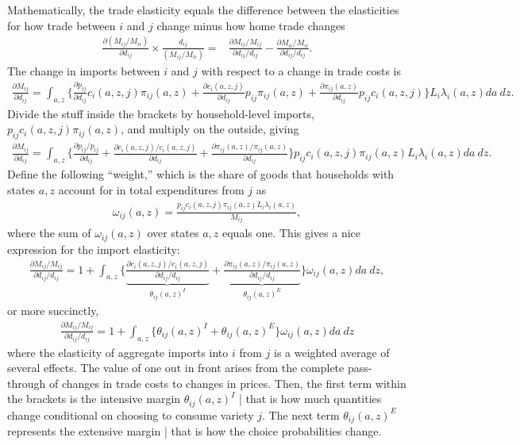 \documentclass[12pt,pdftex]{article}
\begin{document}
\begin{onehalfspacing}
Mathematically, the trade elasticity equals the difference between the elasticities for how trade between $i$ and $j$ change minus how home trade changes
\begin{align}
\frac{\partial ( M_{ij} / M_{ii} )}{\partial d_{ij}} \times \frac{d_{ij}}{( M_{ij} / M_{ii} )} =& \frac{\partial M_{ij} / M_{ij}}{\partial d_{ij} / d_{ij}}  - \frac{\partial M_{ii} / M_{ii}}{\partial d_{ij} / d_{ij}}.
\label{apx-eq:def_trade_elasticity}
\end{align}
The change in imports between $i$ and $j$ with respect to a change in trade costs is
\begin{align}
\frac{\partial  M_{ij}}{\partial d_{ij}} = \int_{a,z} \bigg \{\frac{\partial p_{ij}}{\partial d_{ij}} c_{i}(a,z,j) \pi_{ij}(a,z) +  \frac{\partial c_{i}(a,z,j)}{\partial d_{ij}} p_{ij} \pi_{ij}(a,z) +
 \frac{\partial \pi_{ij}(a,z)}{\partial d_{ij}} p_{ij}c_{i}(a,z,j) \bigg \} L_i \lambda_{i}(a,z) da \ dz.
\end{align}
Divide the stuff inside the brackets by household-level imports, $p_{ij}c_{i}(a,z,j)\pi_{ij}(a,z)$, and multiply on the outside, giving
\begin{align}
\frac{\partial  M_{ij}}{\partial d_{ij}} = \int_{a,z}  \bigg \{ \frac{\partial p_{ij}/p_{ij}}{\partial d_{ij}}  + \frac{\partial c_{i}(a,z,j)/ c_{i}(a,z,j)}{\partial d_{ij}} +
 \frac{\partial \pi_{ij}(a,z) / \pi_{ij}(a,z)}{\partial d_{ij}}  \bigg \} p_{ij}c_{i}(a,z,j)\pi_{ij}(a,z) L_i \lambda_{i}(a,z)da \ dz.
\end{align}
Define the following ``weight,'' which is the share of goods that households with states $a,z$ account for in total expenditures from $j$ as
\begin{align}
\omega_{ij}(a,z) = \frac{p_{ij}c_{i}(a,z,j)\pi_{ij}(a,z) L_i \lambda_{i}(a,z)}{M_{ij}},
\end{align}
where the sum of $\omega_{ij}(a,z)$ over states $a,z$ equals one. This gives a nice expression for the import elasticity:
\begin{align}
\frac{\partial  M_{ij} / M_{ij}}{\partial d_{ij} / d_{ij}} = 1 + \int_{a,z} \bigg \{ \underbrace{ \frac{\partial c_{i}(a,z,j)/ c_{i}(a,z,j)}{\partial d_{ij} / d_{ij}} }_{\theta_{ij}(a,z)^{I}}+
\underbrace{\frac{\partial \pi_{ij}(a,z) / \pi_{ij}(a,z)}{\partial d_{ij} / d_{ij}} }_{\theta_{ij}(a,z)^{E}} \bigg \} \omega_{ij}(a,z)da \ dz,
\end{align}
or more succinctly,
\begin{align}
\frac{\partial  M_{ij} / M_{ij}}{\partial d_{ij} / d_{ij}} = 1 + \int_{a,z} \bigg \{ \theta_{ij}(a,z)^{I} + \theta_{ij}(a,z)^{E} \bigg \}\omega_{ij}(a,z)da \ dz
\end{align}
where the elasticity of aggregate imports into $i$ from $j$ is a weighted average of several effects. The value of one out in front arises from the complete pass-through of changes in trade costs to changes in prices. Then, the first term within the brackets is the intensive margin $\theta_{ij}(a,z)^{I}$ | that is how much quantities change conditional on choosing to consume variety $j$. The next term $\theta_{ij}(a,z)^{E}$ represents the extensive margin | that is how the choice probabilities change.


\end{onehalfspacing}
\end{document}
